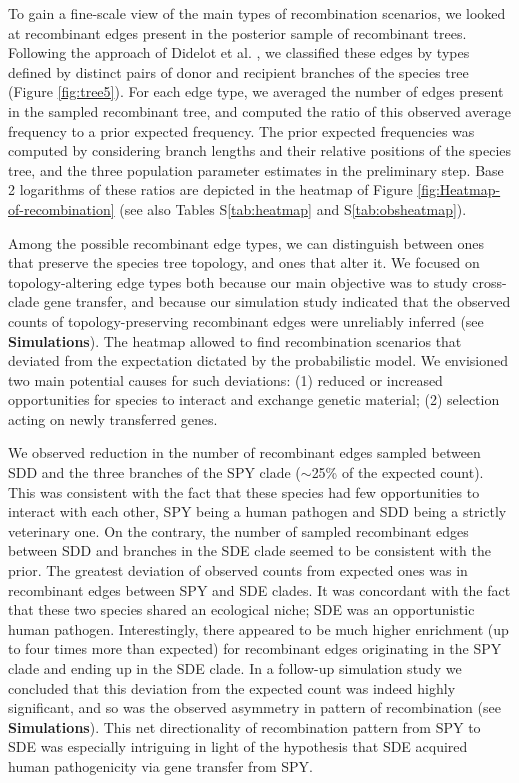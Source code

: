 \documentclass[10pt]{article}
\begin{document}
To gain a fine-scale view of the main types of recombination scenarios, we
looked at recombinant edges present in the posterior sample of recombinant
trees. Following the approach of Didelot et al. \cite{Didelot2010}, we
classified these edges by types defined by distinct pairs of donor and recipient
branches of the species tree (Figure \ref{fig:tree5}). For each edge type, we
averaged the number of edges present in the sampled recombinant tree, and
computed the ratio of this observed average frequency to a prior expected
frequency. The prior expected frequencies was computed by considering branch
lengths and their relative positions of the species tree, and the three
population parameter estimates in the preliminary step.  Base 2 logarithms of
these ratios are depicted in the heatmap of Figure
\ref{fig:Heatmap-of-recombination} (see also Tables S\ref{tab:heatmap} and
S\ref{tab:obsheatmap}).

Among the possible recombinant edge types, we can distinguish between ones that
preserve the species tree topology, and ones that alter it. We focused on 
topology-altering edge types both because our main objective was to study
cross-clade gene transfer, and because our simulation study indicated that the
observed counts of topology-preserving recombinant edges were unreliably
inferred (see \textbf{Simulations}). The heatmap allowed to find recombination
scenarios that deviated from the expectation dictated by the probabilistic
model.  We envisioned two main potential causes for such deviations: (1) reduced
or increased opportunities for species to interact and exchange genetic
material; (2) selection acting on newly transferred genes. 

We observed reduction in the number of recombinant edges sampled between SDD and
the three branches of the SPY clade ($\sim$25\% of the expected count). This was
consistent with the fact that these species had few opportunities to interact
with each other, SPY being a human pathogen and SDD being a strictly veterinary
one.  On the contrary, the number of sampled recombinant edges between SDD and
branches in the SDE clade seemed to be consistent with the prior.  The greatest
deviation of observed counts from expected ones was in recombinant edges between
SPY and SDE clades. It was concordant with the fact that these two species
shared an ecological niche; SDE was an opportunistic human pathogen.
Interestingly, there appeared to be much higher enrichment (up to four times
more than expected) for recombinant edges originating in the SPY clade and
ending up in the SDE clade.  In a follow-up simulation study we concluded that
this deviation from the expected count was indeed highly significant, and so was
the observed asymmetry in pattern of recombination (see \textbf{Simulations}).
This net directionality of recombination pattern from SPY to SDE was especially
intriguing in light of the hypothesis that SDE acquired human pathogenicity via
gene transfer from SPY.
\end{document}
